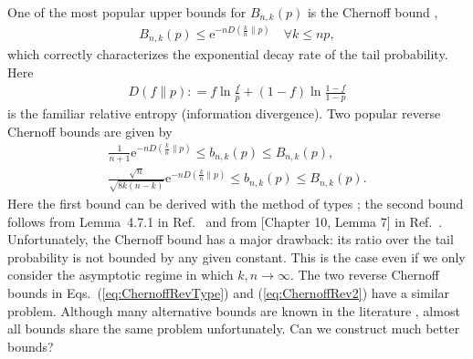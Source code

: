 \documentclass[aop]{imsart}
\theoremstyle{plain}
\theoremstyle{remark}
\newcommand{\rme}{\mathrm{e}}
\newcommand{\1}{\operatorname{\uppercase\expandafter{\romannumeral1}}}
\newcommand{\2}{\operatorname{\uppercase\expandafter{\romannumeral2}}}
\newcommand{\3}{\operatorname{\uppercase\expandafter{\romannumeral3}}}
\newcommand{\4}{\operatorname{\uppercase\expandafter{\romannumeral4}}}
\newcommand{\5}{\operatorname{\uppercase\expandafter{\romannumeral5}}}
\newcommand{\6}{\operatorname{\uppercase\expandafter{\romannumeral6}}}
\newcommand{\7}{\operatorname{\uppercase\expandafter{\romannumeral7}}}
\newcommand{\8}{\operatorname{\uppercase\expandafter{\romannumeral8}}}
\newcommand{\9}{\operatorname{\uppercase\expandafter{\romannumeral9}}}
\newcommand{\eqsref}[2]{Eqs.~(\ref{#1}) and (\ref{#2})}
\begin{document}
One of the most popular upper bounds for $B_{n,k}(p)$ is the Chernoff bound \cite{Cher52,Hoef63},
\begin{align}
B_{n,k}(p)\leq \rme^{-n D(\frac{k}{n}\| p)}\quad \forall k\leq np \label{eq:ChernoffB},
\end{align}
which correctly characterizes the exponential decay rate of the tail probability. Here
\begin{align}
D(f\|p): =f \ln \frac{f}{p}+(1-f) \ln \frac{1-f}{1-p}
\end{align}
is the familiar relative entropy (information divergence).  Two popular reverse  Chernoff bounds are given by  
\begin{gather}
\frac{1}{n+1} \rme^{-nD(\frac{k}{n}\| p)}\leq 	b_{n,k}(p)\leq B_{n,k}(p), \label{eq:ChernoffRevType}\\
\frac{\sqrt{n}}{\sqrt{8k(n-k)}}\rme^{-nD(\frac{k}{n}\| p)}\leq b_{n,k}(p)\leq 
B_{n,k}(p). \label{eq:ChernoffRev2}
\end{gather}
Here the first bound can be derived    with the method of types \cite{CsisK11,Csis98}; the second bound  follows from Lemma~4.7.1  in Ref.~\cite{Ash92book} and from [Chapter 10, Lemma 7] in Ref.~\cite{MacWS77book}. 
Unfortunately,  the Chernoff bound has a major drawback: its ratio over the tail probability is not bounded by any given constant. This is the case even if we only consider the asymptotic regime in which $k,n\to \infty$. The two reverse Chernoff bounds in \eqsref{eq:ChernoffRevType}{eq:ChernoffRev2}  have a similar problem. Although  many alternative bounds are  known in the literature \cite{MacWS77book,Ash92book, JohnKK05,CsisK11,Csis98,Haya17book},  almost all bounds share the same problem unfortunately. Can we construct much better bounds? 
\end{document}
